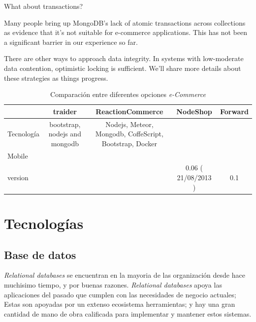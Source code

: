 What about transactions?


Many people bring up MongoDB’s lack of atomic transactions across collections as evidence that it’s not suitable for e-commerce applications. This has not been a significant barrier in our experience so far.

There are other ways to approach data integrity. In systems with low-moderate data contention, optimistic locking is sufficient. We’ll share more details about these strategies as things progress.



\begin{table}[h!]
    \tiny
   
\begin{tabular}{ |l|c|c|c|c| }
\hline
	&
	traider\cite{online_Traider}&
	ReactionCommerce\cite{online_reactionCommerce}&
	NodeShop\cite{online_NodeShop}&
	Forward\cite{online_Forward}
 
\\ \hline
	Tecnología &
	bootstrap, nodejs and mongodb &
	Nodejs, Meteor, Mongodb, CoffeScript, Bootstrap, Docker&
	&
	

\\ \hline
	Mobile &
	&
	&
	&
\\ \hline
	version &
	&
	&
	0.06 ( 21/08/2013 )&
	0.1

\\ \hline
\end{tabular}
    \caption{ Comparación entre diferentes opciones \textit{e-Commerce}}
    \label{tab:wide_table}
\end{table}

\section{Tecnologías }\label{cap:estadoArte:tecnologias}


\subsection{Base de datos}

\textit{Relational databases} se encuentran en la mayoria de las organización desde hace muchisimo tiempo, y por buenas razones. \textit{Relational databases} apoya las aplicaciones del pasado que cumplen con las necesidades de negocio actuales; Estas son apoyadas por un extenso ecosistema herramientas; y hay una gran cantidad de mano de obra calificada para implementar y mantener estos sistemas.

